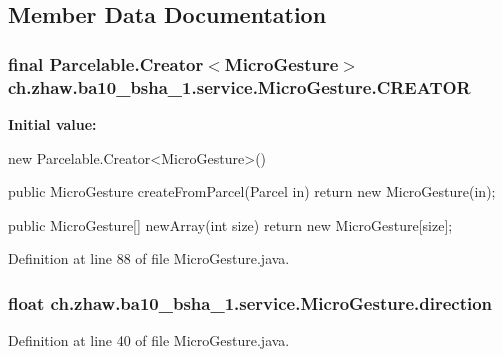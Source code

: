 \subsection{Member Data Documentation}
\hypertarget{classch_1_1zhaw_1_1ba10__bsha__1_1_1service_1_1MicroGesture_a017ccacff6d5f99fd9ee14943767feab}{
\subsubsection[{CREATOR}]{\setlength{\rightskip}{0pt plus 5cm}final Parcelable.Creator$<${\bf MicroGesture}$>$ {\bf ch.zhaw.ba10\_\-bsha\_\-1.service.MicroGesture.CREATOR}}}
\label{classch_1_1zhaw_1_1ba10__bsha__1_1_1service_1_1MicroGesture_a017ccacff6d5f99fd9ee14943767feab}
{\bfseries Initial value:}
\begin{DoxyCode}
 new Parcelable.Creator<MicroGesture>() {
                public MicroGesture createFromParcel(Parcel in) {
                        return new MicroGesture(in);
                }

                public MicroGesture[] newArray(int size) {
                        return new MicroGesture[size];
                }
        }
\end{DoxyCode}


Definition at line 88 of file MicroGesture.java.\hypertarget{classch_1_1zhaw_1_1ba10__bsha__1_1_1service_1_1MicroGesture_a99f2fb0a7f8e2667b5fb8043dde76ff8}{
\subsubsection[{direction}]{\setlength{\rightskip}{0pt plus 5cm}float {\bf ch.zhaw.ba10\_\-bsha\_\-1.service.MicroGesture.direction}}}
\label{classch_1_1zhaw_1_1ba10__bsha__1_1_1service_1_1MicroGesture_a99f2fb0a7f8e2667b5fb8043dde76ff8}


Definition at line 40 of file MicroGesture.java.

